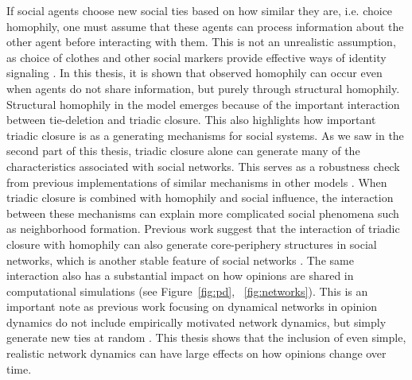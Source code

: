 \documentclass[11pt]{article}
\begin{document}
If social agents choose new social ties based on how similar they are, i.e. choice homophily, one must assume that these agents can process information about the other agent before interacting with them. This is not an unrealistic assumption, as choice of clothes and other social markers provide effective ways of identity signaling \cite{smaldino_models_2022}. In this thesis, it is shown that observed homophily can occur even when agents do not share information, but purely through structural homophily. Structural homophily in the model emerges because of the important interaction between tie-deletion and triadic closure. This also highlights how important triadic closure is as a generating mechanisms for social systems. As we saw in the second part of this thesis, triadic closure alone can generate many of the characteristics associated with social networks. This serves as a robustness check from previous implementations of similar mechanisms in other models \cite{jackson_search_2004, jackson_meeting_2007}. When triadic closure is combined with homophily and social influence, the interaction between these mechanisms can explain more complicated social phenomena such as neighborhood formation. Previous work suggest that the interaction of triadic closure with homophily can also generate core-periphery structures in social networks, which is another stable feature of social networks \cite{asikainen_cumulative_2020}. The same interaction also has a substantial impact on how opinions are shared in computational simulations (see Figure~\ref{fig:pd}, ~\ref{fig:networks}). This is an important note as previous work focusing on dynamical networks in opinion dynamics do not include empirically motivated network dynamics, but simply generate new ties at random \cite{kozma2008consensus}. This thesis shows that the inclusion of even simple, realistic network dynamics can have large effects on how opinions change over time. 
\end{document}
